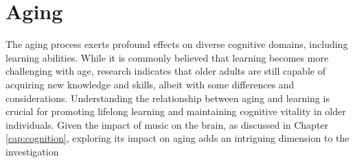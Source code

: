 %
%
%
%
%

\section{Aging}
The aging process exerts profound effects on diverse cognitive domains, including learning abilities. While it is commonly believed that learning becomes more challenging with age, research indicates that older adults are still capable of acquiring new knowledge and skills, albeit with some differences and considerations. Understanding the relationship between aging and learning is crucial for promoting lifelong learning and maintaining cognitive vitality in older individuals. Given the impact of music on the brain, as discussed in Chapter \ref{cap:cognition}, exploring its impact on aging adds an intriguing dimension to the investigation 


